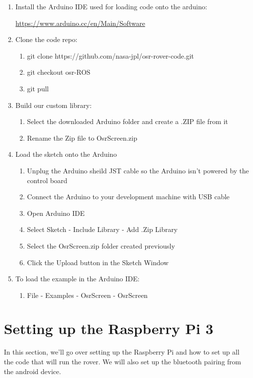 \documentclass[12pt]{article}
\begin{document}
\begin{enumerate} 
\item Install the Arduino IDE used for loading code onto the arduino:

	\href{https://www.arduino.cc/en/Main/Software}{https://www.arduino.cc/en/Main/Software}

\item Clone the code repo:
	\begin{enumerate}
	\item git clone https://github.com/nasa-jpl/osr-rover-code.git
	\item git checkout osr-ROS
	\item git pull
	\end{enumerate}

\item Build our custom library:
	\begin{enumerate}
	\item Select the downloaded Arduino folder and create a .ZIP file from it
	\item Rename the Zip file to OsrScreen.zip
	\end{enumerate}

\item Load the sketch onto the Arduino
	\begin{enumerate}
	\item Unplug the Arduino sheild JST cable so the Arduino isn't powered by the control board
	\item Connect the Arduino to your development machine with USB cable
	\item Open Arduino IDE
	\item Select Sketch - Include Library - Add .Zip Library 
	\item Select the OsrScreen.zip folder created previously
	\item Click the Upload button in the Sketch Window	
	\end{enumerate}

\item To load the example in the Arduino IDE: 
	\begin{enumerate}
	\item File - Examples - OsrScreen - OsrScreen 
	\end{enumerate}

\end{enumerate}

\section{Setting up the Raspberry Pi 3}
In this section, we'll go over setting up the Raspberry Pi and how to set up all the code that will run the rover. We will also set up the bluetooth pairing from the android device.
\end{document}
